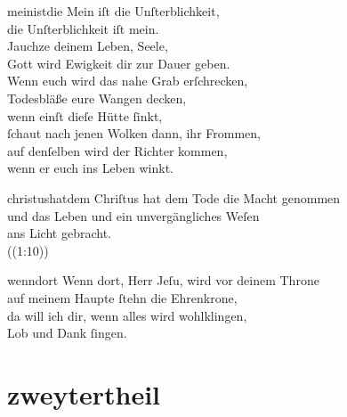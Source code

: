 \documentclass[shorttitlesize=55,tocstyle=ref-genre]{ees}
\begin{document}
{\begin{movement}{meinistdie}
  \voice[Soprano]
  Mein iſt die Unſterblichkeit,\\
  die Unſterblichkeit iſt mein.\\
  Jauchze deinem Leben, Seele,\\
  Gott wird Ewigkeit dir zur Dauer geben.\\
  Wenn euch wird das nahe Grab erſchrecken,\\
  Todesbläße eure Wangen decken,\\
  wenn einſt dieſe Hütte ſinkt,\\
  ſchaut nach jenen Wolken dann, ihr Frommen,\\
  auf denſelben wird der Richter kommen,\\
  wenn er euch ins Leben winkt.
\end{movement}

\begin{movement}{christushatdem}
  \voice[Coro]
  Chriſtus hat dem Tode die Macht genommen\\
  und das Leben und ein unvergängliches Weſen\\
  ans Licht gebracht.\\
  ((1:10))
\end{movement}

\begin{movement}{wenndort}
  \voice[Coro]
  Wenn dort, Herr Jeſu, wird vor deinem Throne\\
  auf meinem Haupte ſtehn die Ehrenkrone,\\
  da will ich dir, wenn alles wird wohlklingen,\\
  Lob und Dank ſingen.
\end{movement}

\part{zweytertheil}

}
\end{document}
